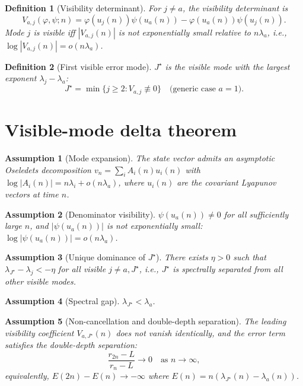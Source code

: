 \documentclass[11pt]{article}
\newtheorem{definition}{Definition}
\newtheorem{assumption}{Assumption}
\begin{document}
\begin{definition}[Visibility determinant]
For $j \neq a$, the visibility determinant is
\[
V_{a,j}(\varphi, \psi; n) = \varphi(u_j(n))\psi(u_a(n)) - \varphi(u_a(n))\psi(u_j(n)).
\]
Mode $j$ is \emph{visible} iff $|V_{a,j}(n)|$ is not exponentially small relative to $n\lambda_a$, i.e., $\log|V_{a,j}(n)| = o(n\lambda_a)$.
\end{definition}

\begin{definition}[First visible error mode]
$J^\star$ is the visible mode with the largest exponent $\lambda_j - \lambda_a$:
\[
J^\star = \min\{j \geq 2 : V_{a,j} \not\equiv 0\} \quad \text{(generic case $a=1$)}.
\]
\end{definition}

\section{Visible-mode delta theorem}
\label{sec:theorem}

\begin{assumption}[Mode expansion]\label{ass:mode}
The state vector admits an asymptotic Oseledets decomposition $v_n = \sum_i A_i(n) u_i(n)$ with $\log|A_i(n)| = n\lambda_i + o(n\lambda_a)$, where $u_i(n)$ are the covariant Lyapunov vectors at time $n$.
\end{assumption}

\begin{assumption}[Denominator visibility]\label{ass:denvis}
$\psi(u_a(n)) \neq 0$ for all sufficiently large $n$, and $|\psi(u_a(n))|$ is not exponentially small: $\log|\psi(u_a(n))| = o(n\lambda_a)$.
\end{assumption}

\begin{assumption}[Unique dominance of $J^\star$]\label{ass:dom}
There exists $\eta > 0$ such that $\lambda_{J^\star} - \lambda_j < -\eta$ for all visible $j \neq a, J^\star$, i.e., $J^\star$ is spectrally separated from all other visible modes.
\end{assumption}

\begin{assumption}[Spectral gap]\label{ass:gap}
$\lambda_{J^\star} < \lambda_a$.
\end{assumption}

\begin{assumption}[Non-cancellation and double-depth separation]\label{ass:noncanc}
The leading visibility coefficient $V_{a,J^\star}(n)$ does not vanish identically, and the error term satisfies the double-depth separation:
\[
\frac{r_{2n} - L}{r_n - L} \to 0 \quad \text{as } n \to \infty,
\]
equivalently, $E(2n) - E(n) \to -\infty$ where $E(n) = n(\lambda_{J^\star}(n) - \lambda_a(n))$.
\end{assumption}
\end{document}
